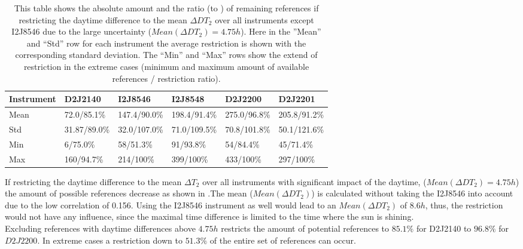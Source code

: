 	\begin{table}
	\centering
		\begin{tabular}{|p{1.8cm}|p{2.15cm}|p{2.15cm}|p{2.15cm}|p{2.15cm}|p{2.15cm}|}
		Instrument	&D2J2140&I2J8546& I2J8548&D2J2200&D2J2201\\
		\toprule
		Mean&
		72.0/85.1\% &		147.4/90.0\%&
		198.4/91.4\%&		275.0/96.8\%&
		205.8/91.2\%\\
		\midrule
		Std&		31.87/89.0\%&32.0/107.0\%&
		71.0/109.5\%&		70.8/101.8\%&
		50.1/121.6\% \\
		\midrule
		Min&
		6/75.0\%&		58/51.3\%
		&91/93.8\%		&54/84.4\%
		&45/71.4\%\\
		\midrule
		Max&
		160/94.7\% &
		214/100\% &
		399/100\% &
		433/100\% &
		297/100\% \\
		\bottomrule
	\end{tabular}
	\caption{This table shows the absolute amount and the ratio (to ) of remaining references if restricting the daytime difference to the mean $\Delta DT_{2}$ over all instruments except I2J8546 due to the large uncertainty ($Mean(\Delta DT_{2}) = 4.75h$). Here in the ”Mean” and “Std” row for each  instrument the average restriction is shown with the corresponding standard deviation. The “Min” and “Max” rows show the extend of restriction in the extreme cases (minimum and maximum amount of available references / restriction ratio).}
	\label{tab:daytimerest}
\end{table}	
If restricting the daytime difference to the mean $\Delta T_{2}$ over all instruments with significant impact of the daytime, ($Mean(\Delta DT_{2}) = 4.75h$) the amount of possible references decrease as shown in .The mean ($Mean(\Delta DT_{2})$) is calculated without taking the I2J8546 into account due to the low correlation of 0.156. Using the I2J8546 instrument as well would lead to an  $Mean(\Delta DT_{2})$ of $8.6h$, thus, the restriction would not have any influence, since the maximal time difference is limited to the time where the sun is shining.\\ 
Excluding references with daytime differences above $4.75h$ restricts the amount of potential references to $85.1\%$ for D2J2140 to $96.8\%$ for $ D2J2200$. In extreme cases a restriction down to $51.3\%$ of the entire set of references can occur.
	
